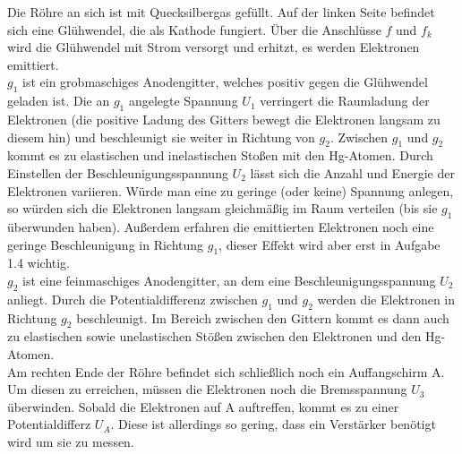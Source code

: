 \documentclass[a4paper,titlepage]{scrartcl}
\numberwithin{equation}{section}
\begin{document}
Die Röhre an sich ist mit Quecksilbergas gefüllt. Auf der linken Seite befindet sich eine Glühwendel, die als Kathode fungiert. Über die Anschlüsse $f$ und $f_k$ wird die Glühwendel mit Strom versorgt und erhitzt, es werden Elektronen emittiert.\\
$g_1$ ist ein grobmaschiges Anodengitter, welches positiv gegen die Glühwendel geladen ist. Die an $g_1$ angelegte Spannung $U_1$ verringert die Raumladung der Elektronen (die positive Ladung des Gitters bewegt die Elektronen langsam zu diesem hin) und beschleunigt sie weiter in Richtung von $g_2$. Zwischen $g_1$ und $g_2$ kommt es zu elastischen und inelastischen Stoßen mit den Hg-Atomen. Durch Einstellen der Beschleunigungsspannung $U_2$ lässt sich die Anzahl und Energie der Elektronen variieren. Würde man eine zu geringe (oder keine) Spannung anlegen, so würden sich die Elektronen langsam gleichmäßig im Raum verteilen (bis sie $g_1$ überwunden haben). Außerdem erfahren die emittierten Elektronen noch eine geringe Beschleunigung in Richtung $g_1$, dieser Effekt wird aber erst in Aufgabe 1.4 wichtig.\\
$g_2$ ist eine feinmaschiges Anodengitter, an dem eine Beschleunigungsspannung $U_2$ anliegt. Durch die Potentialdifferenz zwischen $g_1$ und $g_2$ werden die Elektronen in Richtung $g_2$ beschleunigt. Im Bereich zwischen den Gittern kommt es dann auch zu elastischen sowie unelastischen Stößen zwischen den Elektronen und den Hg-Atomen.\\
Am rechten Ende der Röhre befindet sich schließlich noch ein Auffangschirm A. Um diesen zu erreichen, müssen die Elektronen noch die Bremsspannung $U_3$ überwinden. Sobald die Elektronen auf A auftreffen, kommt es zu einer Potentialdifferz $U_A$. Diese ist allerdings so gering, dass ein Verstärker benötigt wird um sie zu messen.\\
\end{document}
